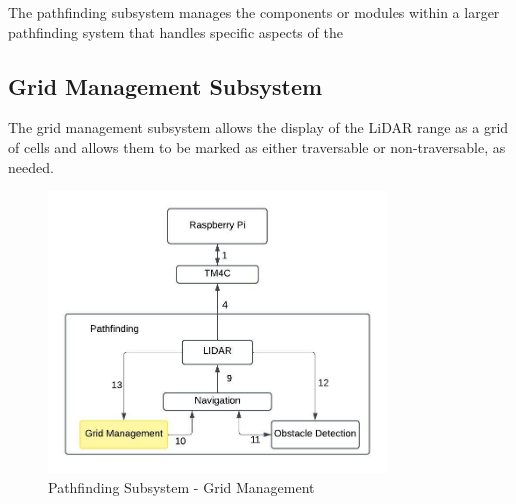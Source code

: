 
The pathfinding subsystem manages the components or modules within a larger pathfinding system that handles specific aspects of the 

\subsection{Grid Management Subsystem}
The grid management subsystem allows the display of the LiDAR range as a grid of cells and allows them to be marked as either traversable or non-traversable, as needed.



\begin{figure}[h!]
	\centering
 	\includegraphics[width=0.80\textwidth]{images/pathfinding_images/GridManagement.jpeg}
 \caption{Pathfinding Subsystem - Grid Management} %
\end{figure}


